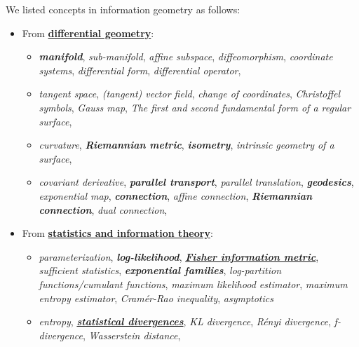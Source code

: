 \documentclass[11pt]{article}
\begin{document}
We listed concepts in information geometry as follows: 
\begin{itemize}
\item From \underline{\textbf{differential geometry}}: 
\begin{itemize}
\item \emph{\textbf{manifold}}, \emph{sub-manifold}, \emph{affine subspace},   \emph{diffeomorphism}, \emph{coordinate systems}, \emph{differential form}, \emph{differential operator},
\item \emph{tangent space}, \emph{(tangent) vector field},  \emph{change of coordinates},  \emph{Christoffel symbols},  \emph{Gauss map},  \emph{The first and second fundamental form of a regular surface},   
\item  \emph{curvature}, \emph{\textbf{Riemannian metric}}, \emph{\textbf{isometry}}, \emph{intrinsic geometry of a surface}, 
\item  \emph{covariant derivative}, \emph{\textbf{parallel transport}}, \emph{parallel translation}, \emph{\textbf{geodesics}}, \emph{exponential map}, \emph{\textbf{connection}}, \emph{affine connection}, \emph{\textbf{Riemannian connection}}, \emph{dual connection}, 
\end{itemize}

\item From \underline{\textbf{statistics and information theory}}: 
\begin{itemize}
\item \emph{parameterization},  \emph{\textbf{log-likelihood}}, \underline{\emph{\textbf{Fisher information metric}}},  \emph{sufficient statistics}, \emph{\textbf{exponential families}}, \emph{log-partition functions/cumulant functions}, \emph{maximum likelihood estimator}, \emph{maximum entropy estimator}, \emph{Cram\'er-Rao inequality}, \emph{asymptotics} 
\item  \emph{entropy}, \underline{\emph{\textbf{statistical divergences}}}, \emph{KL divergence}, \emph{R\'enyi divergence}, \emph{f-divergence}, \emph{Wasserstein distance}, 
\end{itemize}
\end{itemize}
\end{document}
